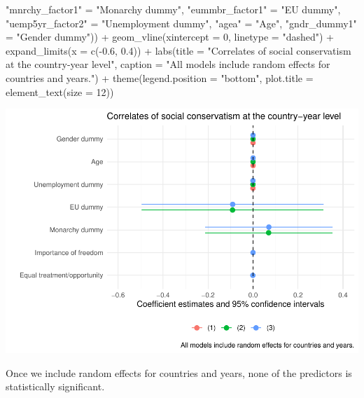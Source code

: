 \documentclass[
]{article}
\newenvironment{Shaded}{\begin{snugshade}}{\end{snugshade}}
\newcommand{\AttributeTok}[1]{\textcolor[rgb]{0.77,0.63,0.00}{#1}}
\newcommand{\DecValTok}[1]{\textcolor[rgb]{0.00,0.00,0.81}{#1}}
\newcommand{\FloatTok}[1]{\textcolor[rgb]{0.00,0.00,0.81}{#1}}
\newcommand{\FunctionTok}[1]{\textcolor[rgb]{0.00,0.00,0.00}{#1}}
\newcommand{\NormalTok}[1]{#1}
\newcommand{\OtherTok}[1]{\textcolor[rgb]{0.56,0.35,0.01}{#1}}
\newcommand{\SpecialCharTok}[1]{\textcolor[rgb]{0.00,0.00,0.00}{#1}}
\newcommand{\StringTok}[1]{\textcolor[rgb]{0.31,0.60,0.02}{#1}}
\begin{document}
\begin{Shaded}
\begin{Highlighting}[]
                       \StringTok{"mnrchy\_factor1"} \OtherTok{=} \StringTok{"Monarchy dummy"}\NormalTok{, }
                       \StringTok{"eummbr\_factor1"} \OtherTok{=} \StringTok{"EU dummy"}\NormalTok{, }
                       \StringTok{"uemp5yr\_factor2"} \OtherTok{=} \StringTok{"Unemployment dummy"}\NormalTok{, }
                       \StringTok{"agea"} \OtherTok{=} \StringTok{"Age"}\NormalTok{, }
                       \StringTok{"gndr\_dummy1"} \OtherTok{=} \StringTok{"Gender dummy"}\NormalTok{)) }\SpecialCharTok{+}
  \FunctionTok{geom\_vline}\NormalTok{(}\AttributeTok{xintercept =} \DecValTok{0}\NormalTok{, }\AttributeTok{linetype =} \StringTok{"dashed"}\NormalTok{) }\SpecialCharTok{+}
  \FunctionTok{expand\_limits}\NormalTok{(}\AttributeTok{x =} \FunctionTok{c}\NormalTok{(}\SpecialCharTok{{-}}\FloatTok{0.6}\NormalTok{, }\FloatTok{0.4}\NormalTok{)) }\SpecialCharTok{+}
  \FunctionTok{labs}\NormalTok{(}\AttributeTok{title =} \StringTok{"Correlates of social conservatism at the country{-}year level"}\NormalTok{, }
       \AttributeTok{caption =} \StringTok{"All models include random effects for countries and years."}\NormalTok{) }\SpecialCharTok{+}
  \FunctionTok{theme}\NormalTok{(}\AttributeTok{legend.position =} \StringTok{"bottom"}\NormalTok{, }
        \AttributeTok{plot.title =} \FunctionTok{element\_text}\NormalTok{(}\AttributeTok{size =} \DecValTok{12}\NormalTok{))}
\end{Highlighting}
\end{Shaded}

\includegraphics{AVCD-Assignment3-Edenhofer_files/figure-latex/socio-cons-cntry-year-re-1.pdf}

Once we include random effects for countries and years, none of the
predictors is statistically significant.
\end{document}
